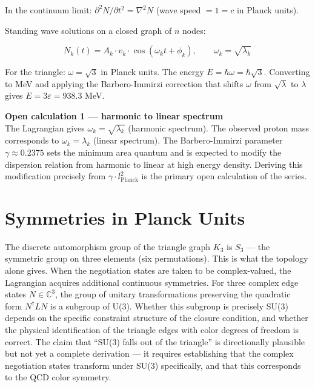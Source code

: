 \documentclass[11pt,letterpaper]{article}
\newenvironment{plainbox}{\begin{tcolorbox}[colback=blue!3!white,colframe=blue!40!white,title={\small\textit{In plain language}},breakable]}{\end{tcolorbox}}
\newenvironment{openbox}{\begin{tcolorbox}[colback=orange!5!white,colframe=orange!60!black,title={\small\textit{Open calculation}},breakable]}{\end{tcolorbox}}
\begin{document}
In the continuum limit: \(\partial^2 N/\partial t^2 = \nabla^2 N\) (wave speed \(= 1 = c\) in Planck units).

Standing wave solutions on a closed graph of \(n\) nodes:

\begin{equation}
N_k(t) = A_k \cdot v_k \cdot \cos(\omega_k t + \phi_k), \qquad \omega_k = \sqrt{\lambda_k}
\end{equation}

For the triangle: \(\omega = \sqrt{3}\) in Planck units. The energy \(E = \hbar\omega = \hbar\sqrt{3}\). Converting to MeV and applying the Barbero-Immirzi correction that shifts \(\omega\) from \(\sqrt{\lambda}\) to \(\lambda\) gives \(E = 3\varepsilon = 938.3\) MeV.

\begin{openbox}
\textbf{Open calculation 1 --- harmonic to linear spectrum}\\[4pt]
The Lagrangian gives $\omega_k = \sqrt{\lambda_k}$ (harmonic spectrum). The observed proton mass corresponds to $\omega_k = \lambda_k$ (linear spectrum). The Barbero-Immirzi parameter $\gamma \approx 0.2375$ sets the minimum area quantum and is expected to modify the dispersion relation from harmonic to linear at high energy density. Deriving this modification precisely from $\gamma \cdot l_\text{Planck}^2$ is the primary open calculation of the series.
\end{openbox}

\section{Symmetries in Planck Units}
\label{sec:orgd25a7d5}

\begin{plainbox}
The discrete automorphism group of the triangle graph \(K_3\) is \(S_3\) --- the symmetric group on three elements (six permutations). This is what the topology alone gives. When the negotiation states are taken to be complex-valued, the Lagrangian acquires additional continuous symmetries. For three complex edge states \(N \in \mathbb{C}^3\), the group of unitary transformations preserving the quadratic form \(N^\dagger L N\) is a subgroup of U(3). Whether this subgroup is precisely SU(3) depends on the specific constraint structure of the closure condition, and whether the physical identification of the triangle edges with color degrees of freedom is correct. The claim that ``SU(3) falls out of the triangle'' is directionally plausible but not yet a complete derivation --- it requires establishing that the complex negotiation states transform under SU(3) specifically, and that this corresponds to the QCD color symmetry.
\end{plainbox}
\end{document}
